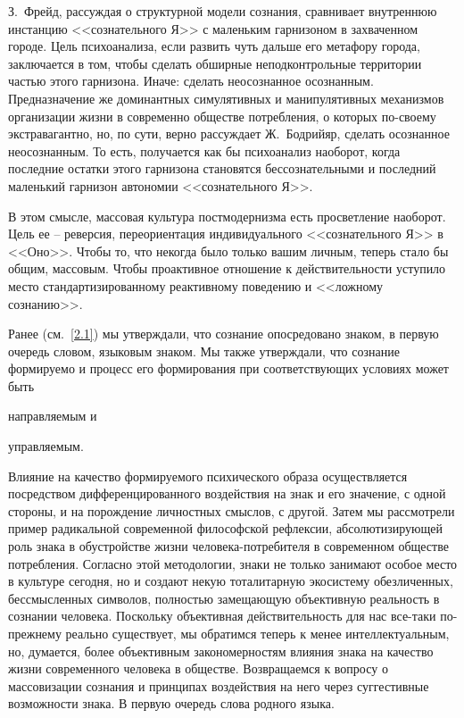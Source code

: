 З.~Фрейд, рассуждая о структурной модели сознания, сравнивает внутреннюю
инстанцию <<сознательного Я>> с маленьким гарнизоном в захваченном городе.\autocite[][116]{freud1992}
Цель психоанализа, если развить чуть дальше его метафору города, заключается в том,
чтобы сделать обширные неподконтрольные территории частью этого гарнизона.
Иначе: сделать неосознанное осознанным. Предназначение же доминантных симулятивных
и манипулятивных механизмов организации жизни в современно обществе потребления, о
которых по-своему экстравагантно, но, по сути, верно рассуждает Ж.~Бодрийяр, сделать
осознанное неосознанным. То есть, получается как бы психоанализ наоборот, когда
последние остатки этого гарнизона становятся бессознательными и последний маленький
гарнизон автономии <<сознательного Я>>.

В этом смысле, массовая культура постмодернизма есть просветление наоборот.
Цель ее -- реверсия, переориентация индивидуального <<сознательного Я>> в <<Оно>>.
Чтобы то, что некогда было только вашим личным, теперь стало бы общим, массовым.
Чтобы проактивное отношение к действительности уступило место стандартизированному
реактивному поведению и <<ложному сознанию>>.\autocite[][89]{eagleton1991ideology}

Ранее (см.~\ref{2.1}) мы утверждали, что сознание опосредовано знаком, в первую
очередь словом, языковым знаком. Мы также утверждали, что сознание формируемо и
процесс его формирования при соответствующих условиях может быть
\begin{enumerate*}[label=\asbuk*)]
    \item направляемым и
    \item управляемым.
\end{enumerate*}
Влияние на качество формируемого психического образа осуществляется
посредством дифференцированного воздействия на знак и его значение, с одной стороны,
и на порождение личностных смыслов, с другой. Затем мы рассмотрели пример
радикальной современной философской рефлексии, абсолютизирующей роль знака в
обустройстве жизни человека-потребителя в современном обществе потребления.
Согласно этой методологии, знаки не только занимают особое место в культуре
сегодня, но и создают некую тоталитарную экосистему обезличенных, бессмысленных
символов, полностью замещающую объективную реальность в сознании человека.
Поскольку объективная действительность для нас все-таки по-прежнему реально
существует, мы обратимся теперь к менее интеллектуальным, но, думается, более
объективным закономерностям влияния знака на качество жизни современного человека в
обществе. Возвращаемся к вопросу о массовизации сознания и принципах воздействия
на него через суггестивные возможности знака. В первую очередь слова родного языка.

